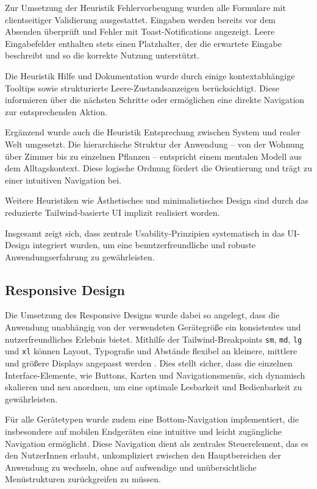 Zur Umsetzung der Heuristik Fehlervorbeugung wurden alle Formulare mit clientseitiger Validierung ausgestattet. Eingaben werden bereits vor dem Absenden überprüft und Fehler mit Toast-Notifications angezeigt. Leere Eingabefelder enthalten stets einen Platzhalter, der die erwartete Eingabe beschreibt und so die korrekte Nutzung unterstützt.

Die Heuristik Hilfe und Dokumentation wurde durch einige kontextabhängige Tooltips sowie strukturierte Leere-Zustandsanzeigen berücksichtigt. Diese informieren über die nächsten Schritte oder ermöglichen eine direkte Navigation zur entsprechenden Aktion.

Ergänzend wurde auch die Heuristik Entsprechung zwischen System und realer Welt umgesetzt. Die hierarchische Struktur der Anwendung – von der Wohnung über Zimmer bis zu einzelnen Pflanzen – entspricht einem mentalen Modell aus dem Alltagskontext. Diese logische Ordnung fördert die Orientierung und trägt zu einer intuitiven Navigation bei.

Weitere Heuristiken wie Ästhetisches und minimalistisches Design sind durch das reduzierte Tailwind-basierte UI implizit realisiert worden.

Insgesamt zeigt sich, dass zentrale Usability-Prinzipien systematisch in das UI-Design integriert wurden, um eine benutzerfreundliche und robuste Anwendungserfahrung zu gewährleisten.

\subsection{Responsive Design}

Die Umsetzung des Responsive Designs wurde dabei so angelegt, dass die Anwendung unabhängig von der verwendeten Gerätegröße ein konsistentes und nutzerfreundliches Erlebnis bietet. Mithilfe der Tailwind-Breakpoints \texttt{sm}, \texttt{md}, \texttt{lg} und \texttt{xl} können Layout, Typografie und Abstände flexibel an kleinere, mittlere und größere Displays angepasst werden \cite{TailwindCSS}. Dies stellt sicher, dass die einzelnen Interface-Elemente, wie Buttons, Karten und Navigationsmenüs, sich dynamisch skalieren und neu anordnen, um eine optimale Lesbarkeit und Bedienbarkeit zu gewährleisten.

Für alle Gerätetypen wurde zudem eine Bottom-Navigation implementiert, die insbesondere auf mobilen Endgeräten eine intuitive und leicht zugängliche Navigation ermöglicht. Diese Navigation dient als zentrales Steuerelement, das es den NutzerInnen erlaubt, unkompliziert zwischen den Hauptbereichen der Anwendung zu wechseln, ohne auf aufwendige und unübersichtliche Menüstrukturen zurückgreifen zu müssen.

